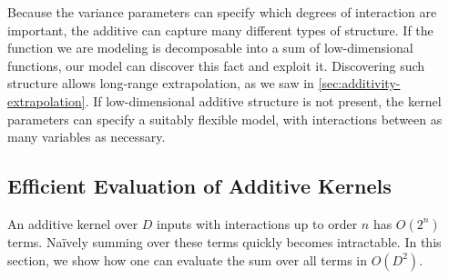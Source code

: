 
Because the variance parameters can specify which degrees of interaction are important, the additive \gp{} can capture many different types of structure.
If the function we are modeling is decomposable into a sum of low-dimensional functions, our model can discover this fact and exploit it.
Discovering such structure allows long-range extrapolation, as we saw in \cref{sec:additivity-extrapolation}.
If low-dimensional additive structure is not present, the kernel parameters can specify a suitably flexible model, with interactions between as many variables as necessary.









\subsection{Efficient Evaluation of Additive Kernels}
An additive kernel over $D$ inputs with interactions up to order $n$ has $O(2^n)$ terms.
Na\"{i}vely summing over these terms quickly becomes intractable.
In this section, we show how one can evaluate the sum over all terms in $O(D^2)$.

